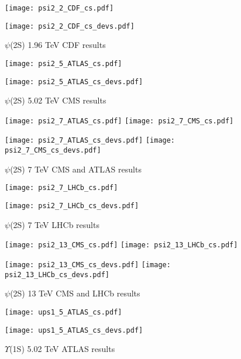 \documentclass{article}
\begin{document}
\clearpage

\begin{figure}
\centering
\texttt{[image: psi2\_2\_CDF\_cs.pdf]}

\texttt{[image: psi2\_2\_CDF\_cs\_devs.pdf]}
\caption{$\psi$(2S) 1.96 TeV CDF results}
\end{figure}

\clearpage

\begin{figure}
\centering
\texttt{[image: psi2\_5\_ATLAS\_cs.pdf]}

\texttt{[image: psi2\_5\_ATLAS\_cs\_devs.pdf]}
\caption{$\psi$(2S) 5.02 TeV CMS results}
\end{figure}

\clearpage

\begin{figure}
\centering
\texttt{[image: psi2\_7\_ATLAS\_cs.pdf]}
\texttt{[image: psi2\_7\_CMS\_cs.pdf]}

\texttt{[image: psi2\_7\_ATLAS\_cs\_devs.pdf]}
\texttt{[image: psi2\_7\_CMS\_cs\_devs.pdf]}
\caption{$\psi$(2S) 7 TeV CMS and ATLAS results}
\end{figure}

\clearpage

\begin{figure}
\centering
\texttt{[image: psi2\_7\_LHCb\_cs.pdf]}

\texttt{[image: psi2\_7\_LHCb\_cs\_devs.pdf]}
\caption{$\psi$(2S) 7 TeV LHCb results}
\end{figure}

\clearpage

\begin{figure}
\centering
\texttt{[image: psi2\_13\_CMS\_cs.pdf]}
\texttt{[image: psi2\_13\_LHCb\_cs.pdf]}

\texttt{[image: psi2\_13\_CMS\_cs\_devs.pdf]}
\texttt{[image: psi2\_13\_LHCb\_cs\_devs.pdf]}
\caption{$\psi$(2S) 13 TeV CMS and LHCb results}
\end{figure}

\clearpage

\begin{figure}
\centering
\texttt{[image: ups1\_5\_ATLAS\_cs.pdf]}

\texttt{[image: ups1\_5\_ATLAS\_cs\_devs.pdf]}
\caption{$\Upsilon$(1S) 5.02 TeV ATLAS results}
\end{figure}
\end{document}
